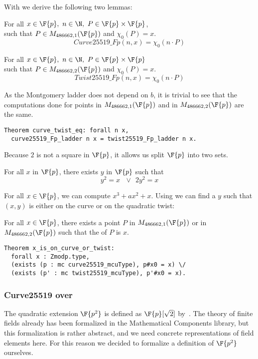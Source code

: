With  we derive the following two lemmas:
\begin{lemma}
  For all $x \in \F{p},\ n \in \N,\ P \in \F{p} \times \F{p}$,\\
  such that $P \in M_{486662,1}(\F{p})$ and $\chi_0(P) = x$.
  $$Curve25519\_Fp(n,x) = \chi_0(n \cdot P)$$
\end{lemma}
\begin{lemma}
  For all $x \in \F{p},\ n \in \N,\ P \in \F{p} \times \F{p}$\\
  such that $P \in M_{486662,2}(\F{p})$ and $\chi_0(P) = x$.
  $$Twist25519\_Fp(n,x) = \chi_0(n \cdot P)$$
\end{lemma}
As the Montgomery ladder does not depend on $b$, it is trivial to
see that the computations done for points in $M_{486662,1}(\F{p})$ and in
$M_{486662,2}(\F{p})$ are the same.
\begin{lstlisting}[language=Coq]
Theorem curve_twist_eq: forall n x,
  curve25519_Fp_ladder n x = twist25519_Fp_ladder n x.
\end{lstlisting}

Because $2$ is not a square in $\F{p}$, it allows us split $\F{p}$ into two sets.
\begin{lemma}
  \label{lemma:square-or-2square}
  For all $x$ in $\F{p}$, there exists $y$ in $\F{p}$ such that
  $$y^2 = x\ \ \ \lor\ \ 2y^2 = x$$
\end{lemma}
For all $x \in \F{p}$, we can compute $x^3 + ax^2 + x$. Using 
we can find a $y$ such that $(x,y)$ is either on the curve or on the quadratic twist:
\begin{lemma}
  \label{lemma:curve-or-twist}
  For all $x \in \F{p}$, there exists a point $P$ in $M_{486662,1}(\F{p})$ or
  in $M_{486662,2}(\F{p})$ such that the \xcoord of $P$ is $x$.
\end{lemma}
\begin{lstlisting}[language=Coq,belowskip=-0.5 \baselineskip]
Theorem x_is_on_curve_or_twist:
  forall x : Zmodp.type,
  (exists (p : mc curve25519_mcuType), p#x0 = x) \/
  (exists (p' : mc twist25519_mcuType), p'#x0 = x).
\end{lstlisting}

\subsubsection{Curve25519 over }
\label{subsec:curvep2}

The quadratic extension $\F{p^2}$ is defined as $\F{p}[\sqrt{2}]$ by~\cite{Ber06}.
The theory of finite fields already has been formalized in the Mathematical Components
library,
but this formalization is rather abstract, and we need concrete representations of field
elements here.
For this reason we decided to formalize a definition of $\F{p^2}$ ourselves.

